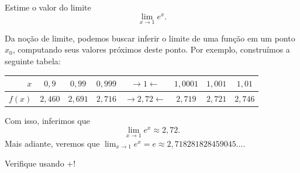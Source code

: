 
\begin{exeresol}
  Estime o valor do limite
  \begin{equation}
    \lim_{x\to 1} e^x.
  \end{equation}
\end{exeresol}
\begin{resol}
  Da noção de limite, podemos buscar inferir o limite de uma função em um ponto $x_0$, computando seus valores próximos deste ponto. Por exemplo, construímos a seguinte tabela:
  
  \begin{tabular}{r|ccc|c|ccc}
    $x$ & $0,9$ & $0,99$ & $0,999$ & $\rightarrow 1 \leftarrow$ & $1,0001$ & $1,001$ & $1,01$\\\hline
    $f(x)$ & $2,460$ & $2,691$ & $2,716$ & $\rightarrow 2,72 \leftarrow$ & $2,719$ & $2,721$ & $2,746$
  \end{tabular}
  
  Com isso, inferimos que
  \begin{equation}
    \lim_{x\to 1} e^x \approx 2,72.
  \end{equation}
  Mais adiante, veremos que $\lim_{x\to 1} e^x = e \approx 2,718281828459045 ...$.
  
  \ifispython
  Verifique usando {\python}+{\sympy}!
  \fi
\end{resol}

